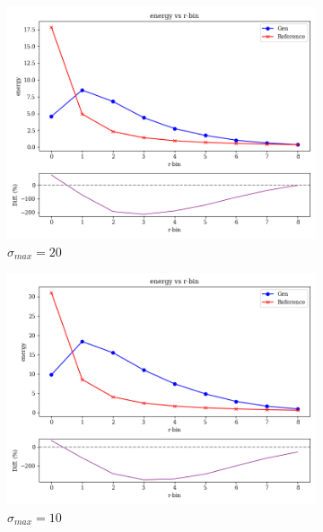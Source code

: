 \begin{figure}[bthp]
    \centering
    \begin{subfigure}[b]{0.23\textwidth}
        \centering
        \includegraphics[width=\textwidth]{Figures/ve20_2.png}
        \caption{$\sigma_{max}=20$}
        \label{fig:ve20_2}
    \end{subfigure}
    \hfill
    \begin{subfigure}[b]{0.23\textwidth}
        \centering
        \includegraphics[width=\textwidth]{Figures/ve10_2.png}
        \caption{$\sigma_{max}=10$}
        \label{fig:ve10_2}
    \end{subfigure}
    \hfill
    \begin{subfigure}[b]{0.23\textwidth}

\end{subfigure}
\end{figure}
